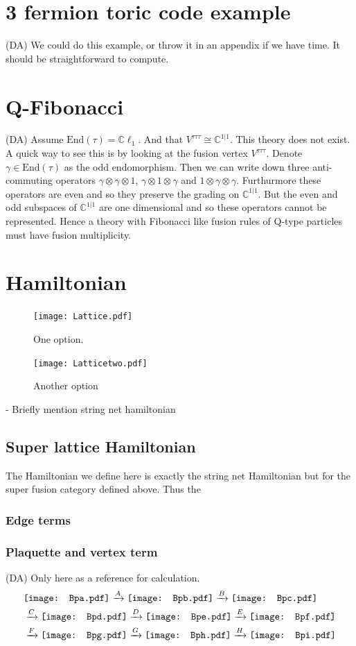 \documentclass[12pt,a4paper]{article}
\newcounter{arrow}
\newcommand{\tp}{\otimes}
\newcommand{\dave}[1]{{\color{ao(english)}\footnotesize{(DA) #1}}}
\newcommand{\Bpa}{\mathord{\vcenter{\hbox{\texttt{[image: Bpa.pdf]}}}}}
\newcommand{\Bpb}{\mathord{\vcenter{\hbox{\texttt{[image: Bpb.pdf]}}}}}
\newcommand{\Bpc}{\mathord{\vcenter{\hbox{\texttt{[image: Bpc.pdf]}}}}}
\newcommand{\Bpd}{\mathord{\vcenter{\hbox{\texttt{[image: Bpd.pdf]}}}}}
\newcommand{\Bpe}{\mathord{\vcenter{\hbox{\texttt{[image: Bpe.pdf]}}}}}
\newcommand{\Bpf}{\mathord{\vcenter{\hbox{\texttt{[image: Bpf.pdf]}}}}}
\newcommand{\Bpg}{\mathord{\vcenter{\hbox{\texttt{[image: Bpg.pdf]}}}}}
\newcommand{\Bph}{\mathord{\vcenter{\hbox{\texttt{[image: Bph.pdf]}}}}}
\newcommand{\Bpi}{\mathord{\vcenter{\hbox{\texttt{[image: Bpi.pdf]}}}}}
\begin{document}
\section{3 fermion toric code example}
\dave{We could do this example, or throw it in an appendix if we have time. It should be straightforward to compute. }


\section{Q-Fibonacci}
\dave{Assume $\text{End}(\tau) = \mathbb{C} \ell_1$. And that $V^{\tau \tau \tau} \cong \mathbb{C}^{1|1}$.
This theory does not exist. 
A quick way to see this is by looking at the fusion vertex $V^{\tau \tau \tau}$. 
Denote $\gamma \in \text{End}(\tau)$ as the odd endomorphism.
Then we can write down three anti-commuting operators $\gamma \tp \gamma \tp 1$, $\gamma \tp 1 \tp \gamma$ and $1\tp \gamma \tp \gamma$. 
Furthurmore these operators are even and so they preserve the grading on $\mathbb{C}^{1|1}$. 
But the even and odd subspaces of $\mathbb{C}^{1|1}$ are one dimensional and so these operators cannot be represented.
Hence a theory with Fibonacci like fusion rules of Q-type particles must have fusion multiplicity.
}
 \section{Hamiltonian} 
 \begin{figure}
 \texttt{[image: Lattice.pdf]}
 \caption{One option.}
 \end{figure}
 
  \begin{figure}
 \texttt{[image: Latticetwo.pdf]}
 \caption{Another option}
 \end{figure}
  
 - Briefly mention string net hamiltonian

 \subsection{Super lattice Hamiltonian}
The Hamiltonian we define here is exactly the string net Hamiltonian but for the super fusion category defined above. 
Thus the 
\subsubsection{Edge terms}
\subsubsection{Plaquette and vertex term}
\dave{Only here as a reference for calculation.}
\begin{align}
&\Bpa \xrightarrow{A} \Bpb \xrightarrow{B} \Bpc \\
&\xrightarrow{C}\Bpd  \xrightarrow{D} \Bpe \xrightarrow{E}\Bpf \\
&\xrightarrow{F} \Bpg \xrightarrow{G} \Bph \xrightarrow{H}   \Bpi
\end{align}
 
\end{document}
